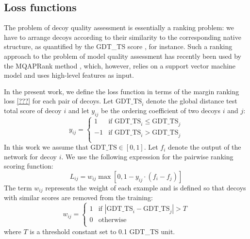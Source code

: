 \subsection{Loss functions}
The problem of decoy quality assessment is essentially a ranking
problem: we have to arrange decoys according to their similarity to
the corresponding native structure, as quantified by the GDT\_TS score
\cite{zemla2001casp4}, for instance. Such a ranking approach to the
problem of model quality assessment has recently been used by the
MQAPRank method \cite{jing2016sorting}, which, however, relies on a
support vector machine model and uses high-level features as
input.

In the present work, we define the loss function in terms of the
margin ranking loss \ref{???} for each pair of decoys.
Let $\text{GDT\_TS}_i$ denote the global distance test total score of
decoy $i$ and let $y_{ij}$ be the ordering coefficient of two decoys
$i$ and $j$:
$$
y_{ij} = \begin{cases}
               1& \text{if }\text{GDT\_TS}_i \leq \text{GDT\_TS}_j \\
               -1& \text{if }\text{GDT\_TS}_i > \text{GDT\_TS}_j \\
            \end{cases}
$$
%
In this work we assume that $\text{GDT\_TS}\in [0,1]$.
%
Let $f_i$ denote the output of the network for decoy $i$. We use the
following expression for the pairwise ranking scoring function:
%
$$
L_{ij} = w_{ij} \max \left[ 0, 1 - y_{ij} \cdot (f_i - f_j) \right]
$$
%
The term $w_{ij}$ represents the weight of each example and is defined
so that decoys with similar scores are removed from the training:
%
$$
w_{ij} = \begin{cases}
               1& \text{if } \left| \text{GDT\_TS}_i - \text{GDT\_TS}_j \right| > T \\
               0& \text{otherwise} \\ 
            \end{cases}
$$
%
where $T$ is a threshold constant set to 0.1 GDT\_TS unit.

